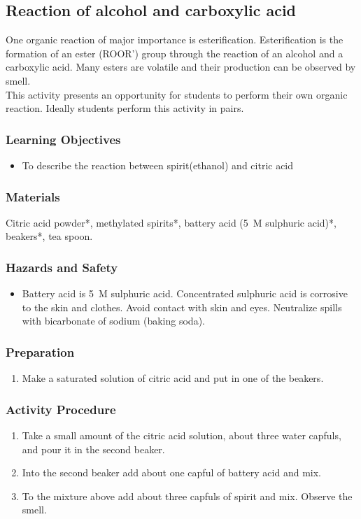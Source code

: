 \subsection{Reaction of alcohol and carboxylic acid}

One organic reaction of major importance is esterification. Esterification is the formation of an ester (ROOR') group through the reaction of an alcohol and a carboxylic acid. Many esters are volatile and their production can be observed by smell.\\
This activity presents an opportunity for students to perform their own organic reaction. Ideally students perform this activity in pairs.

\subsubsection*{Learning Objectives}
\begin{itemize}
\item{To describe the reaction between spirit(ethanol) and citric acid}
\end{itemize}

\subsubsection*{Materials}
Citric acid powder*, methylated spirits*, battery acid (5~M sulphuric acid)*, beakers*, tea spoon.

\subsubsection*{Hazards and Safety}
\begin{itemize}
\item{Battery acid is 5~M sulphuric acid. Concentrated sulphuric acid is corrosive to the skin and clothes. Avoid contact with skin and eyes. Neutralize spills with bicarbonate of sodium (baking soda).}
\end{itemize}

\subsubsection*{Preparation}
\begin{enumerate}
\item{Make a saturated solution of citric acid and put in one of the beakers.}
\end{enumerate}

\subsubsection*{Activity Procedure}
\begin{enumerate}
\item{Take a small amount of the citric acid solution, about three water capfuls, and pour it in the second beaker.}
\item{Into the second beaker add about one capful of battery acid and mix.}
\item{To the mixture above add about three capfuls of spirit and mix. Observe the smell.}
\end{enumerate}


